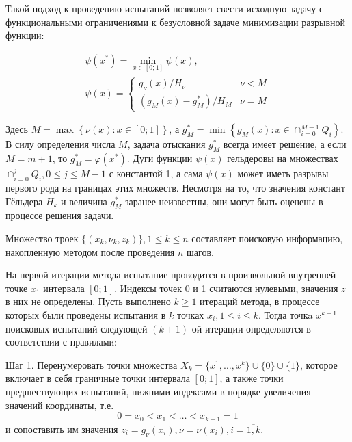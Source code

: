 \documentclass[11pt, oneside, a4paper]{article}
\begin{document}
Такой подход к проведению испытаний позволяет свести исходную задачу с функциональными
ограничениями к безусловной задаче минимизации разрывной функции:

\begin{displaymath}
  \begin{array}{lr}
    \psi (x^{*})=\min_{x\in [0;1]}\psi (x), \\
    \psi (x)={\begin{cases}g_{\nu }(x)/H_{\nu }&\nu <M\\(g_{M}(x)-g_{M}^{*})/H_{M}&\nu =M\end{cases}}
  \end{array}
\end{displaymath}

Здесь \(M=\max_{}^{}\left\{\nu (x):x\in [0;1]\right\}\), а \(g_{M}^{*}=\min _{}^{}\left\{g_{M}(x):x\in \cap _{i=0}^{M-1}Q_{i}\right\}\).
В силу определения числа \(M\), задача отыскания \(g_{M}^{*}\)
всегда имеет решение, а если \(M=m+1\), то \(g_{M}^{*}=\varphi(x^{*})\).
Дуги функции \(\psi (x)\) гельдеровы на множествах \(\cap _{i=0}^{j}Q_{i},0\leq j\leq M-1\)
с константой 1, а сама \(\psi (x)\) может иметь разрывы первого рода на границах этих множеств.
Несмотря на то, что значения констант Гёльдера \(H_k\) и величина \(g_{M}^{*}\) заранее неизвестны,
они могут быть оценены в процессе решения задачи.

Множество троек \(\{(x_k,\nu_k,z_k)\}, 1\leqslant k\leqslant n\) составляет поисковую информацию,
накопленную методом после проведения \(n\) шагов.

На первой итерации метода испытание проводится в произвольной внутренней точке \(x_1\)
интервала \([0;1]\). Индексы точек 0 и 1 считаются нулевыми, значения \(z\) в
них не определены. Пусть выполнено \(k\geqslant 1\) итераций метода,
в процессе которых были проведены испытания в \(k\) точках \(x_i, 1\leqslant i\leqslant k\).
Тогда точкa \(x^{k+1}\) поисковых испытаний следующей \((k+1)\)-ой
итерации определяются в соответствии с правилами:

Шаг 1. Перенумеровать точки множества \(X_k=\{x^1,\dotsc,x^k\}\cup\{0\}\cup\{1\}\),
которое включает в себя граничные точки интервала \([0;1]\), а также точки предшествующих
испытаний, нижними индексами в порядке увеличения значений координаты, т.е.
\begin{displaymath}
0=x_0<x_1<\dotsc<x_{k+1}=1
\end{displaymath}
и сопоставить им значения \(z_{i}=g_{\nu }(x_{i}),\nu =\nu (x_{i}),i={\overline {1,k}}\).
\end{document}
